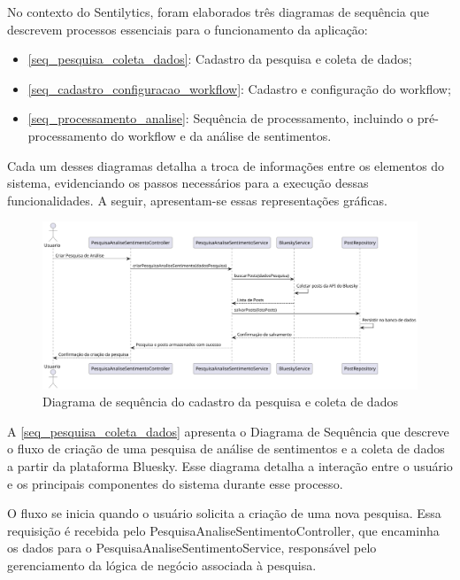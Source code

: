 \documentclass[
	12pt,				%
	oneside,			%
	a4paper,			%
	english,			%
	french,				%
	spanish,			%
	brazil				%
	]{abntex2}
\begin{document}
No contexto do Sentilytics, foram elaborados três diagramas de sequência
que descrevem processos essenciais para o funcionamento da aplicação:

\begin{itemize}
\tightlist
\item
  \autoref{seq_pesquisa_coleta_dados}: Cadastro da pesquisa e coleta de
  dados;
\item
  \autoref{seq_cadastro_configuracao_workflow}: Cadastro e configuração
  do workflow;
\item
  \autoref{seq_processamento_analise}: Sequência de processamento,
  incluindo o pré-processamento do workflow e da análise de sentimentos.
\end{itemize}

Cada um desses diagramas detalha a troca de informações entre os
elementos do sistema, evidenciando os passos necessários para a execução
dessas funcionalidades. A seguir, apresentam-se essas representações
gráficas.

\begin{figure}[htbp]
\hypertarget{seq_pesquisa_coleta_dados}{%
\caption{Diagrama de sequência do cadastro da pesquisa e coleta de dados}\label{seq_pesquisa_coleta_dados}
\begin{center}
\includegraphics[scale=0.4]{imagens/sentilytics/diagramas/sequencia-cadastro-pesquisa-coleta-dados.png}
\end{center}
}
\end{figure}

A \autoref{seq_pesquisa_coleta_dados} apresenta o Diagrama de Sequência
que descreve o fluxo de criação de uma pesquisa de análise de
sentimentos e a coleta de dados a partir da plataforma Bluesky. Esse
diagrama detalha a interação entre o usuário e os principais componentes
do sistema durante esse processo.

O fluxo se inicia quando o usuário solicita a criação de uma nova
pesquisa. Essa requisição é recebida pelo
PesquisaAnaliseSentimentoController, que encaminha os dados para o
PesquisaAnaliseSentimentoService, responsável pelo gerenciamento da
lógica de negócio associada à pesquisa.
\end{document}
